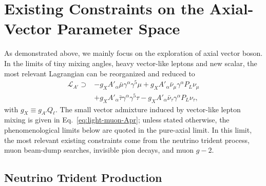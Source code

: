 \documentclass[onecolumn, aps, nofootinbib, prd, preprint, floats, floatfix, amsmath, amssymb, superscriptaddress, preprintnumbers]{revtex4-1}
\begin{document}
\section{Existing Constraints on the Axial-Vector Parameter Space}
\label{sec:phenomenology}
As demonstrated above, we mainly focus on the exploration of axial vector boson. In the limits of tiny mixing angles, heavy vector-like leptons and new scalar, the most relevant Lagrangian can be reorganized and reduced to
\begin{equation}
\begin{aligned}
\mathcal{L}_{A'} \supset & -g_XA'_\alpha\bar\mu\gamma^\alpha\gamma^5\mu
+g_XA'_\alpha\bar\nu_\mu\gamma^\alpha P_L\nu_\mu \\
&+g_X A'_\alpha\bar\tau\gamma^\alpha\gamma^5\tau - g_X A'_\alpha\bar\nu_\tau\gamma^\alpha P_L\nu_\tau,
\end{aligned}
\label{eq:phenomenology-coupling-convention}
\end{equation}
with $g_X\equiv g_{A'} Q_\ell$. The small vector admixture induced by vector-like lepton mixing is given in Eq.~\eqref{eq:light-muon-Apr}; unless stated otherwise, the phenomenological limits below are quoted in the pure-axial limit. In this limit, the most relevant existing constraints come from the neutrino trident process, muon beam-dump searches, invisible pion decays, and muon $g-2$. 

\subsection{Neutrino Trident Production}
\label{subsec:trident}
\end{document}
